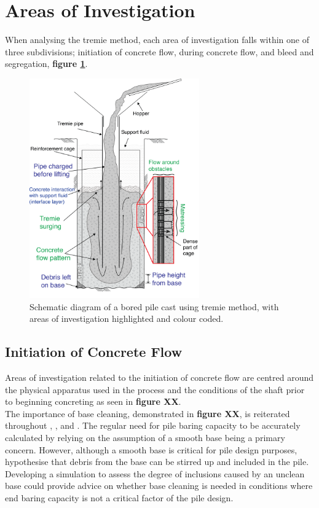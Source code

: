 \section{Areas of Investigation}

When analysing the tremie method, each area of investigation falls within one of three subdivisions; initiation of concrete flow, during concrete flow, and bleed and segregation, {\bfseries figure \ref{fig:tremie_colour}}.

\begin{figure}[H]
\centering
\includegraphics[width=0.65\textwidth]{tremie_colour.png}
\caption{\label{fig:tremie_colour} Schematic diagram of a bored pile cast using tremie method, with areas of investigation highlighted and colour coded.}
\end{figure}


\subsection{Initiation of Concrete Flow}

Areas of investigation related to the initiation of concrete flow are centred around the physical apparatus used in the process and the conditions of the shaft prior to beginning concreting as seen in {\bfseries figure XX}.\\

\noindent
The importance of base cleaning, demonstrated in {\bfseries figure XX}, is reiterated throughout \citeauthor{BS1536}, , and . The regular need for pile baring capacity to be accurately calculated by relying on the assumption of a smooth base being a primary concern. However, although a smooth base is critical for pile design purposes,  hypothesise that debris from the base can be stirred up and included in the pile. Developing a simulation to assess the degree of inclusions caused by an unclean base could provide advice on whether base cleaning is needed in conditions where end baring capacity is not a critical factor of the pile design.\\

